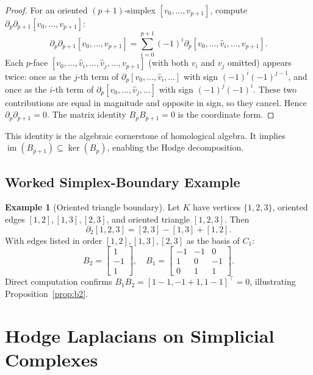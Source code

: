 \documentclass[11pt]{article}
\theoremstyle{definition}
\newtheorem{example}[theorem]{Example}
\theoremstyle{remark}
\DeclareMathOperator{\im}{im}
\begin{document}
\begin{proof}
For an oriented $(p+1)$-simplex $[v_0,\dots,v_{p+1}]$, compute
$\partial_p\partial_{p+1}[v_0,\dots,v_{p+1}]$:
\[
  \partial_p\partial_{p+1}[v_0,\dots,v_{p+1}]
  = \sum_{i=0}^{p+1}(-1)^i\partial_p[v_0,\dots,\hat{v}_i,\dots,v_{p+1}].
\]
Each $p$-face $[v_0,\dots,\hat{v}_i,\dots,\hat{v}_j,\dots,v_{p+1}]$ (with both
$v_i$ and $v_j$ omitted) appears twice: once as the $j$-th term of
$\partial_p[v_0,\dots,\hat{v}_i,\dots]$ with sign $(-1)^i(-1)^{j-1}$, and
once as the $i$-th term of $\partial_p[v_0,\dots,\hat{v}_j,\dots]$ with sign
$(-1)^j(-1)^i$. These two contributions are equal in magnitude and opposite in
sign, so they cancel. Hence $\partial_p\partial_{p+1}=0$. The matrix identity
$B_pB_{p+1}=0$ is the coordinate form.
\end{proof}

This identity is the algebraic cornerstone of homological algebra. It implies
$\im(B_{p+1})\subseteq\ker(B_p)$, enabling the Hodge decomposition.

\subsection{Worked Simplex-Boundary Example}

\begin{example}[Oriented triangle boundary]
\label{ex:boundary}
Let $K$ have vertices $\{1,2,3\}$, oriented edges $[1,2],[1,3],[2,3]$, and
oriented triangle $[1,2,3]$. Then
\[
  \partial_2[1,2,3] = [2,3] - [1,3] + [1,2].
\]
With edges listed in order $[1,2],[1,3],[2,3]$ as the basis of $C_1$:
\[
  B_2 = \begin{bmatrix} 1 \\ -1 \\ 1 \end{bmatrix},\quad
  B_1 = \begin{bmatrix} -1 & -1 & 0 \\ 1 & 0 & -1 \\ 0 & 1 & 1 \end{bmatrix}.
\]
Direct computation confirms $B_1 B_2 = [1-1, -1+1, 1-1]^\top = 0$,
illustrating Proposition~\ref{prop:b2}.
\end{example}


\section{Hodge Laplacians on Simplicial Complexes}
\label{sec:hodge}
\end{document}
